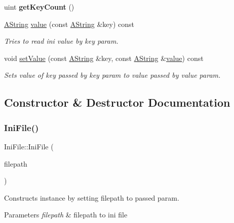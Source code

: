 \begin{DoxyCompactItemize}
uint {\bfseries get\+Key\+Count} ()
\item 
\mbox{\hyperlink{class_a_string}{A\+String}} \mbox{\hyperlink{class_ini_file_acb73544bb44139f7d9b23a36a666abf9}{value}} (const \mbox{\hyperlink{class_a_string}{A\+String}} \&key) const
\begin{DoxyCompactList}\small\item\em Tries to read ini value by key param. \end{DoxyCompactList}\item 
void \mbox{\hyperlink{class_ini_file_a5d6fe5d2b2364c88376d49115007007f}{set\+Value}} (const \mbox{\hyperlink{class_a_string}{A\+String}} \&key, const \mbox{\hyperlink{class_a_string}{A\+String}} \&\mbox{\hyperlink{class_ini_file_acb73544bb44139f7d9b23a36a666abf9}{value}}) const
\begin{DoxyCompactList}\small\item\em Sets value of key passed by key param to value passed by value param. \end{DoxyCompactList}\end{DoxyCompactItemize}


\subsection{Constructor \& Destructor Documentation}
\mbox{\label{class_ini_file_a5cc166dcb8f8584e3ad4be81efbdbda9}} 
\subsubsection{\texorpdfstring{IniFile()}{IniFile()}}
{\footnotesize\ttfamily Ini\+File\+::\+Ini\+File (\begin{DoxyParamCaption}\item[{const \mbox{\hyperlink{class_a_string}{A\+String}} \&}]{filepath }\end{DoxyParamCaption})\hspace{0.3cm}{\ttfamily [explicit]}}



Constructs instance by setting filepath to passed param. 


\begin{DoxyParams}{Parameters}
{\em filepath} & filepath to ini file \\
\hline
\end{DoxyParams}


